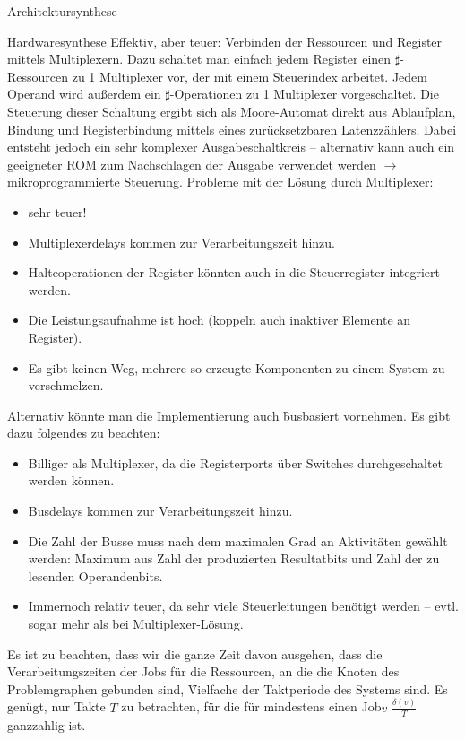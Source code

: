 \begin{chapter}{Architektursynthese}
\begin{section}{Hardwaresynthese}
 Effektiv, aber teuer: Verbinden der Ressourcen und Register mittels \f{Multiplexern}. Dazu schaltet man einfach jedem Register einen $\sharp$-Ressourcen zu 1 Multiplexer vor, der mit einem Steuerindex arbeitet. Jedem Operand wird außerdem ein $\sharp$-Operationen zu 1 Multiplexer vorgeschaltet. Die Steuerung dieser Schaltung ergibt sich als Moore-Automat direkt aus Ablaufplan, Bindung und  Registerbindung mittels eines zurücksetzbaren Latenzzählers. Dabei entsteht jedoch ein sehr komplexer Ausgabeschaltkreis -- alternativ kann auch ein geeigneter ROM zum Nachschlagen der Ausgabe verwendet werden $\rightarrow$ mikroprogrammierte Steuerung. Probleme mit der Lösung durch Multiplexer:
 \begin{itemize}
  \item sehr teuer!
  \item Multiplexerdelays kommen zur Verarbeitungszeit hinzu.
  \item Halteoperationen der Register könnten auch in die Steuerregister integriert werden.
  \item Die Leistungsaufnahme ist hoch (koppeln auch inaktiver Elemente an Register).
  \item Es gibt keinen Weg, mehrere so erzeugte Komponenten zu einem System zu verschmelzen.
 \end{itemize}
 
 Alternativ könnte man die Implementierung auch \f{busbasiert} vornehmen. Es gibt dazu folgendes zu beachten:
 \begin{itemize}
  \item Billiger als Multiplexer, da die Registerports über Switches durchgeschaltet werden können.
  \item Busdelays kommen zur Verarbeitungszeit hinzu.
  \item Die Zahl der Busse muss nach dem maximalen Grad an Aktivitäten gewählt werden: Maximum aus Zahl der produzierten Resultatbits und Zahl der zu lesenden Operandenbits.
  \item Immernoch relativ teuer, da sehr viele Steuerleitungen benötigt werden -- evtl. sogar mehr als bei Multiplexer-Lösung.
 \end{itemize}
 
 Es ist zu beachten, dass wir die ganze Zeit davon ausgehen, dass die Verarbeitungszeiten der Jobs für die Ressourcen, an die die Knoten des Problemgraphen gebunden sind, \f{Vielfache der Taktperiode} des Systems sind. Es genügt, nur Takte $T$ zu betrachten, für die für mindestens einen Job$v$ $\frac{\delta(v)}{T}$ ganzzahlig ist.
 

\end{section}
\end{chapter}
